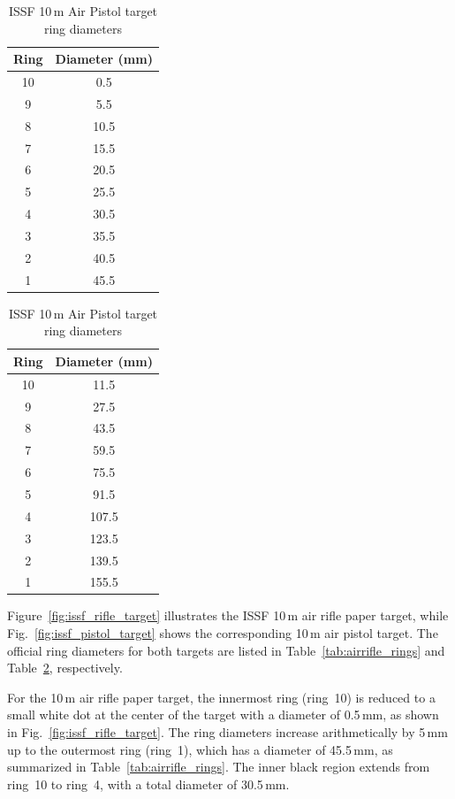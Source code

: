 \begin{table}[ht]
\centering

\begin{minipage}[t]{0.48\textwidth}
\centering
\caption{ISSF 10\,m Air Rifle target ring diameters \cite{issf2023_rules}}
\label{tab:airrifle_rings}
\begin{tabular}{cc}
\hline
\textbf{Ring} & \textbf{Diameter (mm)} \\
\hline
10 & 0.5 \\
9  & 5.5 \\
8  & 10.5 \\
7  & 15.5 \\
6  & 20.5 \\
5  & 25.5 \\
4  & 30.5 \\
3  & 35.5 \\
2  & 40.5 \\
1  & 45.5 \\
\hline
\end{tabular}
\end{minipage}\hfill
\begin{minipage}[t]{0.48\textwidth}
\centering
\caption{ISSF 10\,m Air Pistol target ring diameters \cite{issf2023_rules}}
\label{tab:airpistol_rings}
\begin{tabular}{cc}
\hline
\textbf{Ring} & \textbf{Diameter (mm)} \\
\hline
10 & 11.5 \\
9  & 27.5 \\
8  & 43.5 \\
7  & 59.5 \\
6  & 75.5 \\
5  & 91.5 \\
4  & 107.5 \\
3  & 123.5 \\
2  & 139.5 \\
1  & 155.5 \\
\hline
\end{tabular}
\end{minipage}

\end{table}

Figure~\ref{fig:issf_rifle_target} illustrates the ISSF 10\,m air rifle paper target, while
Fig.~\ref{fig:issf_pistol_target} shows the corresponding 10\,m air pistol target. The
official ring diameters for both targets are listed in
Table~\ref{tab:airrifle_rings} and Table~\ref{tab:airpistol_rings}, respectively.

For the 10\,m air rifle paper target, the innermost ring (ring~10) is reduced to a small
white dot at the center of the target with a diameter of 0.5\,mm, as shown in
Fig.~\ref{fig:issf_rifle_target}. The ring diameters increase arithmetically by 5\,mm up to
the outermost ring (ring~1), which has a diameter of 45.5\,mm, as summarized in
Table~\ref{tab:airrifle_rings}. The inner black region extends from ring~10 to ring~4, with
a total diameter of 30.5\,mm.

